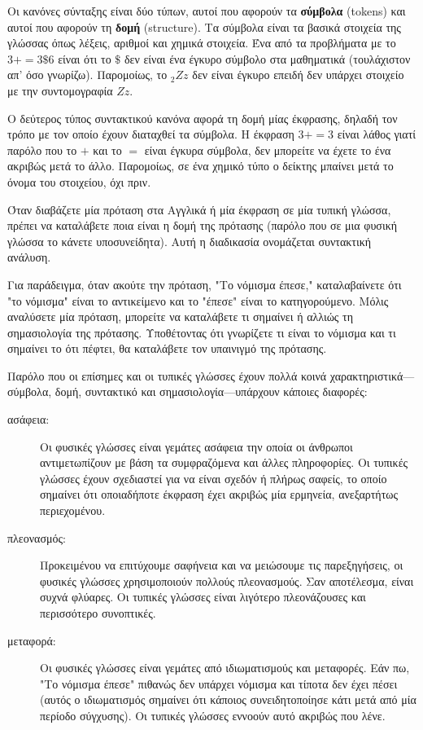 \documentclass[10pt]{book}
\begin{document}
Οι κανόνες σύνταξης είναι δύο τύπων, αυτοί που αφορούν τα {\bf σύμβολα} (tokens)
και αυτοί που αφορούν τη {\bf δομή} (structure). Τα σύμβολα είναι τα βασικά στοιχεία της γλώσσας όπως λέξεις, αριθμοί και χημικά στοιχεία.  Ένα από τα προβλήματα με το
$3 + = 3 \mbox{\$} 6$ είναι ότι το \( \$ \) δεν είναι ένα έγκυρο
σύμβολο στα μαθηματικά (τουλάχιστον απ' όσο γνωρίζω).  Παρομοίως, το
$_2Zz$ δεν είναι έγκυρο επειδή δεν υπάρχει στοιχείο με την συντομογραφία
$Zz$.


Ο δεύτερος τύπος συντακτικού κανόνα αφορά τη δομή μίας έκφρασης,
δηλαδή τον τρόπο με τον οποίο έχουν διαταχθεί τα σύμβολα.  
Η έκφραση $3 + = 3$ είναι λάθος γιατί παρόλο που το $+$ και το
$=$ είναι έγκυρα σύμβολα, δεν μπορείτε να έχετε το ένα ακριβώς
μετά το άλλο.  Παρομοίως, σε ένα χημικό τύπο ο δείκτης μπαίνει
μετά το όνομα του στοιχείου, όχι πριν.

Όταν διαβάζετε μία πρόταση στα Αγγλικά ή μία έκφραση σε μία τυπική
γλώσσα, πρέπει να καταλάβετε ποια είναι η δομή της πρότασης
(παρόλο που σε μια φυσική γλώσσα το κάνετε υποσυνείδητα).  Αυτή
η διαδικασία ονομάζεται συντακτική ανάλυση.

Για παράδειγμα, όταν ακούτε την πρόταση, "Το νόμισμα έπεσε,"
καταλαβαίνετε ότι "το νόμισμα" είναι το αντικείμενο και το "έπεσε"
είναι το κατηγορούμενο.  Μόλις αναλύσετε μία πρόταση, μπορείτε
να καταλάβετε τι σημαίνει ή αλλιώς τη σημασιολογία της πρότασης.  
Υποθέτοντας ότι γνωρίζετε τι είναι το νόμισμα και τι σημαίνει το ότι
πέφτει, θα καταλάβετε τον υπαινιγμό της πρότασης.

Παρόλο που οι επίσημες και οι τυπικές γλώσσες έχουν πολλά κοινά
χαρακτηριστικά---σύμβολα, δομή, συντακτικό και σημασιολογία---υπάρχουν
κάποιες διαφορές:

\begin{description}

\item[ασάφεια:] Οι φυσικές γλώσσες είναι γεμάτες ασάφεια την οποία
οι άνθρωποι αντιμετωπίζουν με βάση τα συμφραζόμενα και άλλες πληροφορίες.  
Οι τυπικές γλώσσες έχουν σχεδιαστεί για να είναι σχεδόν ή πλήρως σαφείς,
το οποίο σημαίνει ότι οποιαδήποτε έκφραση έχει ακριβώς μία ερμηνεία,
ανεξαρτήτως περιεχομένου.

\item[πλεονασμός:] Προκειμένου να επιτύχουμε σαφήνεια και να μειώσουμε
τις παρεξηγήσεις, οι φυσικές γλώσσες χρησιμοποιούν πολλούς πλεονασμούς.  
Σαν αποτέλεσμα, είναι συχνά φλύαρες.  Οι τυπικές γλώσσες είναι λιγότερο
πλεονάζουσες και περισσότερο συνοπτικές.

\item[μεταφορά:] Οι φυσικές γλώσσες είναι γεμάτες από ιδιωματισμούς
και μεταφορές.  Εάν πω, "Το νόμισμα έπεσε" πιθανώς δεν υπάρχει νόμισμα
και τίποτα δεν έχει πέσει (αυτός ο ιδιωματισμός σημαίνει ότι κάποιος
συνειδητοποίησε κάτι μετά από μία περίοδο σύγχυσης).  Οι τυπικές γλώσσες
εννοούν αυτό ακριβώς που λένε.

\end{description}
\end{document}

